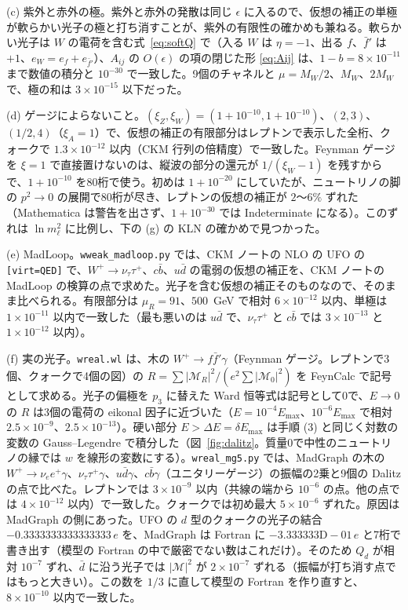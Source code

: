 \documentclass[a4paper,10pt]{ltjsarticle}
\begin{document}
(c) 紫外と赤外の極。紫外と赤外の発散は同じ $\epsilon$ に入るので、仮想の補正の単極が軟らかい光子の極と打ち消すことが、紫外の有限性の確かめも兼ねる。軟らかい光子は $W$ の電荷を含む式~\eqref{eq:softQ} で（入る $W$ は $\eta=-1$、出る $f$、$\bar f'$ は $+1$、$e_W=e_f+e_{\bar f'}$）、$A_{ij}$ の $O(\epsilon)$ の項の閉じた形 \eqref{eq:Aij} は、$1-b=8\times10^{-11}$ まで数値の積分と $10^{-30}$ で一致した。9個のチャネルと $\mu=M_W/2$、$M_W$、$2M_W$ で、極の和は $3\times10^{-15}$ 以下だった。

(d) ゲージによらないこと。$(\xi_Z,\xi_W)=(1+10^{-10},1+10^{-10})$、$(2,3)$、$(1/2,4)$（$\xi_A=1$）で、仮想の補正の有限部分はレプトンで表示した全桁、クォークで $1.3\times10^{-12}$ 以内（CKM 行列の倍精度）で一致した。Feynman ゲージを $\xi=1$ で直接置けないのは、縦波の部分の還元が $1/(\xi_W-1)$ を残すからで、$1+10^{-10}$ を80桁で使う。初めは $1+10^{-20}$ にしていたが、ニュートリノの脚の $p^2\to0$ の展開で80桁が尽き、レプトンの仮想の補正が $2$〜$6\%$ ずれた（Mathematica は警告を出さず、$1+10^{-30}$ では Indeterminate になる）。このずれは $\ln m_\ell^2$ に比例し、下の (g) の KLN の確かめで見つかった。

(e) MadLoop。\texttt{wweak\_madloop.py} では、CKM ノートの NLO の UFO の \texttt{[virt=QED]} で、$W^+\to\nu_\tau\tau^+$、$c\bar b$、$u\bar d$ の電弱の仮想の補正を、CKM ノートの MadLoop の検算の点で求めた。光子を含む仮想の補正そのものなので、そのまま比べられる。有限部分は $\mu_R=91$、$500$~GeV で相対 $6\times10^{-12}$ 以内、単極は $1\times10^{-11}$ 以内で一致した（最も悪いのは $u\bar d$ で、$\nu_\tau\tau^+$ と $c\bar b$ では $3\times10^{-13}$ と $1\times10^{-12}$ 以内）。

(f) 実の光子。\texttt{wreal.wl} は、木の $W^+\to f\bar f'\gamma$（Feynman ゲージ。レプトンで3個、クォークで4個の図）の $R=\sum|\mathcal M_R|^2/(e^2\sum|\mathcal M_0|^2)$ を FeynCalc で記号として求める。光子の偏極を $p_3$ に替えた Ward 恒等式は記号として0で、$E\to0$ の $R$ は3個の電荷の eikonal 因子に近づいた（$E=10^{-4}E_{\max}$、$10^{-6}E_{\max}$ で相対 $2.5\times10^{-9}$、$2.5\times10^{-13}$）。硬い部分 $E>\Delta E=\delta E_{\max}$ は手順 (3) と同じく対数の変数の Gauss--Legendre で積分した（図~\ref{fig:dalitz}。質量0で中性のニュートリノの縁では $w$ を線形の変数にする）。\texttt{wreal\_mg5.py} では、MadGraph の木の $W^+\to\nu_ee^+\gamma$、$\nu_\tau\tau^+\gamma$、$u\bar d\gamma$、$c\bar b\gamma$（ユニタリーゲージ）の振幅の2乗と9個の Dalitz の点で比べた。レプトンでは $3\times10^{-9}$ 以内（共線の端から $10^{-6}$ の点。他の点では $4\times10^{-12}$ 以内）で一致した。クォークでは初め最大 $5\times10^{-6}$ ずれた。原因は MadGraph の側にあった。UFO の $d$ 型のクォークの光子の結合 $-0.3333333333333333\,e$ を、MadGraph は Fortran に $-3.333333\mathrm{D}{-}01\,e$ と7桁で書き出す（模型の Fortran の中で厳密でない数はこれだけ）。そのため $Q_d$ が相対 $10^{-7}$ ずれ、$\bar d$ に沿う光子では $|\mathcal M|^2$ が $2\times10^{-7}$ ずれる（振幅が打ち消す点ではもっと大きい）。この数を $1/3$ に直して模型の Fortran を作り直すと、$8\times10^{-10}$ 以内で一致した。
\end{document}
